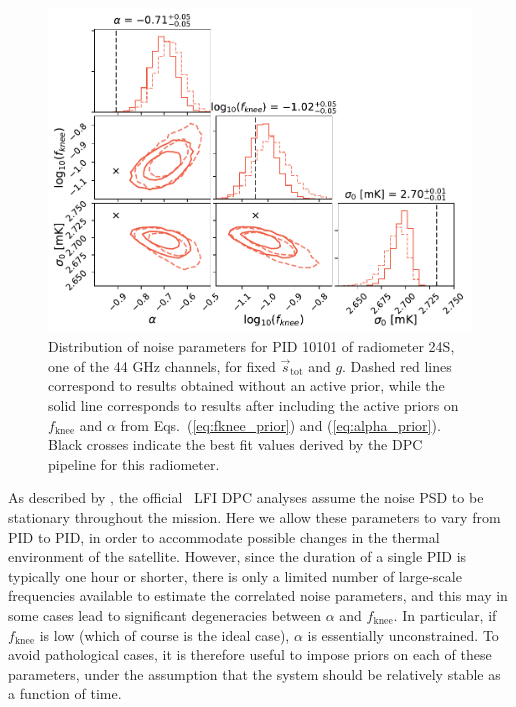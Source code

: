 \documentclass[twocolumn]{aa}
\begin{document}
\begin{figure}
  \begin{center}
    \includegraphics[width=\linewidth]{figs/constraining_power_corner_full.pdf}
  \end{center}
  \caption{Distribution of noise parameters for PID 10101 of
    radiometer 24S, one of the 44 GHz channels, for fixed
    $\vec{s}_\mathrm{tot}$ and $g$. Dashed red lines correspond to
    results obtained without an active prior, while the solid line
    corresponds to results after including the active priors on
    $f_\mathrm{knee}$ and $\alpha$ from Eqs.~(\ref{eq:fknee_prior}) and
    (\ref{eq:alpha_prior}). Black crosses indicate the best fit values
    derived by the DPC pipeline for this radiometer.
    \label{fig:conditional}}
\end{figure}

As described by \citet{planck2016-l02}, the official \Planck\ LFI DPC
analyses assume the noise PSD to be stationary throughout the
mission. Here we allow these parameters to
vary from PID to PID, in order to accommodate possible changes in the
thermal environment of the satellite. However, since the duration of a
single PID is typically one hour or shorter, there is only a limited
number of large-scale frequencies available to estimate the correlated
noise parameters, and this may in some cases lead to significant
degeneracies between $\alpha$ and $f_\mathrm{knee}$. In particular, if
$f_\mathrm{knee}$ is low (which of course is the ideal case), $\alpha$
is essentially unconstrained. To avoid pathological cases, it is
therefore useful to impose priors on each of these parameters, under
the assumption that the system should be relatively stable as a
function of time.
\end{document}
